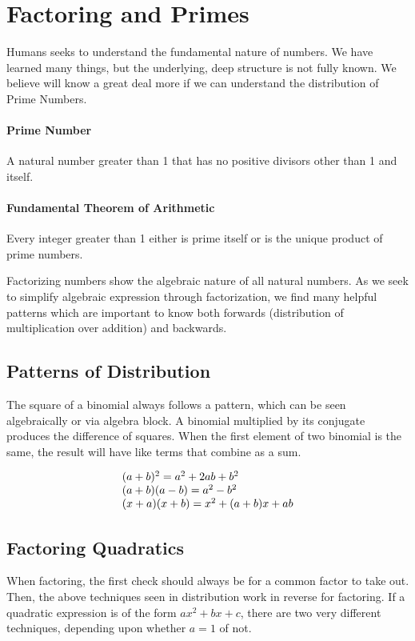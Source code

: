 

\section{Factoring and Primes}\label{sec:primes}
Humans seeks to understand the fundamental nature of numbers.  We have learned
many things, but the underlying, deep structure is not fully known.  We believe will know
a great deal more if we can understand the distribution of Prime Numbers.

\paragraph{Prime Number}
A natural number greater than 1 that has no positive divisors other than 1 and itself.


\paragraph{Fundamental Theorem of Arithmetic}
Every integer greater than 1 either is prime itself or is the unique product of prime numbers.

Factorizing numbers show the algebraic nature of all natural numbers.  As we seek 
to simplify algebraic expression through factorization, we find many helpful patterns which 
are important to know both forwards (distribution of multiplication over addition) and 
backwards.

\subsection{Patterns of Distribution}
The square of a binomial always follows a pattern, which can be seen algebraically or
via algebra block.  A binomial multiplied by its conjugate produces the difference of squares.
When the first element of two binomial is the same, the result will have like terms that combine
as a sum.

\begin{equation}
\begin{array}[b]{l}
(a + b)^2 = a^2 + 2ab + b^2\\
(a + b) (a - b) = a^2 - b^2\\
(x + a) (x + b) = x^2 + (a+b)x + ab\\
\end{array}
\end{equation}

\subsection{Factoring Quadratics}
When factoring, the first check should always be for a common factor to take out.  Then,
the above techniques seen in distribution work in reverse for factoring.  If a quadratic expression
is of the form $ax^2+bx+c$, there are two very different techniques, depending upon whether
$a=1$ of not.  

